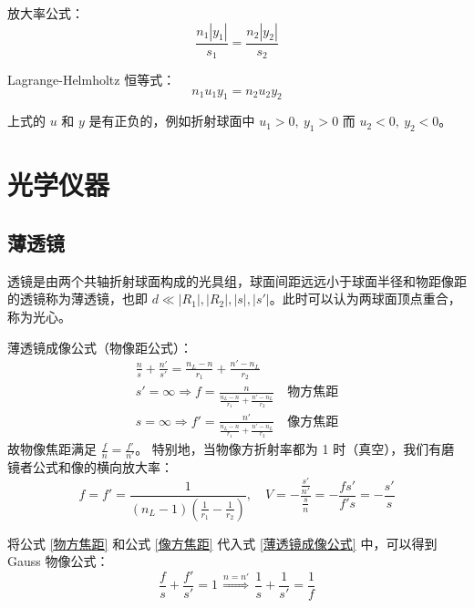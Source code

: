 \documentclass[UTF8]{report}
\theoremstyle{MyLineTheoremStyle} %
\theoremstyle{MyBlockTheoremStyle} %
\theoremstyle{MySubsubsectionStyle} %
\begin{document}
放大率公式：
\begin{equation}
\frac{n_1 | y_1 |}{s_1} = \frac{n_2 | y_2 |}{s_2}
\end{equation}

Lagrange-Helmholtz 恒等式：
\begin{equation}
n_1u_1y_1 = n_2u_2y_2
\end{equation}

上式的 $u$ 和 $y$ 是有正负的，例如折射球面中 $u_1 > 0,\ y_1 >0$ 而 $u_2 <0,\ y_2 < 0$。







\section{光学仪器}


\subsection{薄透镜}

透镜是由两个共轴折射球面构成的光具组，球面间距远远小于球面半径和物距像距的透镜称为薄透镜，也即 $d \ll | R_1 |, | R_2 |, | s |, | s' |$。此时可以认为两球面顶点重合，称为光心。

薄透镜成像公式（物像距公式）：
\begin{gather} 
\frac{n}{s} + \frac{n'}{s'} = \frac{n_L - n}{r_1} + \frac{n' - n_L}{r_2} \label{薄透镜成像公式} \\
s' = \infty \Longrightarrow  f = \frac{n}{\frac{n_L - n}{r_1} + \frac{n' - n_L}{r_2}}\quad \text{物方焦距} \label{物方焦距} \\ 
s = \infty \Longrightarrow  f' = \frac{n'}{\frac{n_L - n}{r_1} + \frac{n' - n_L}{r_2}}\quad \text{像方焦距} \label{像方焦距}
\end{gather}
故物像焦距满足 $\frac{f}{n} = \frac{f'}{n'}$。
特别地，当物像方折射率都为 1 时（真空），我们有磨镜者公式和像的横向放大率：
\begin{equation}
f =f' = \frac{1}{(n_L - 1)(\frac{1}{r_1} - \frac{1}{r_2})},\quad  V = -\frac{\frac{s'}{n'}}{\frac{s}{n}} = -\frac{fs'}{f's} =  - \frac{s'}{s}
\end{equation}


将公式 \ref{物方焦距} 和公式 \ref{像方焦距} 代入式 \ref{薄透镜成像公式} 中，可以得到 Gauss 物像公式：
\begin{equation}
\frac{f}{s} + \frac{f'}{s'} = 1 \overset{n = n'}{\ \ \ \Longrightarrow\ \ \  } \frac{1}{s} + \frac{1}{s'} = \frac{1}{f}
\label{Gauss物像公式}
\end{equation}
\end{document}
